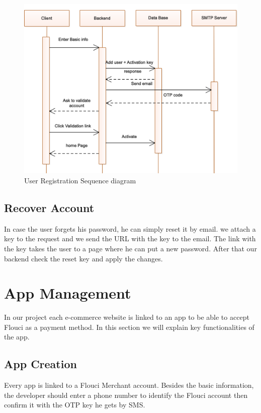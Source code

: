\begin{spacing}{1.2}
\begin{figure}[H]\centering
\includegraphics[scale=0.8]{Register_user_sequence_diagram.png}
\caption{User Registration Sequence diagram}
\label{fig:register}
\end{figure}



\subsection{Recover Account}
In case the user forgets his password, he can simply reset it by email. we attach a key to the request and we send the URL with the key to the email. The link with the key takes the user to a page where he can put a new password. After that our backend check the reset key and apply the changes.

\section{App Management}
In our project each e-commerce website is linked to an app to be able to accept Flouci as a payment method.
In this section we will explain key functionalities of the app.
\subsection{App Creation}
Every app is linked to a Flouci Merchant account. Besides the basic information, the developer should enter a phone number to identify the Flouci account then confirm it with the OTP key he gets by SMS.


\end{spacing}
